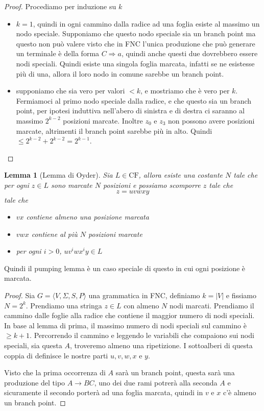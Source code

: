 \documentclass[12pt]{report}
\newtheorem{lemma}{Lemma}
\begin{document}
% 
\begin{proof}
 	Procediamo per induzione su $k$
 	\begin{itemize}
 		\item $k = 1$, quindi in ogni cammino dalla radice ad una foglia esiste al massimo un nodo speciale.
 			Supponiamo che questo nodo speciale sia un branch point
 			ma questo non può valere visto che in FNC l'unica produzione che può generare un terminale è della forma $C \Rightarrow a$, quindi anche questi due dovrebbero essere nodi speciali.
 			Quindi esiste una singola foglia marcata, infatti se ne esistesse più di una, allora il loro nodo in comune sarebbe un branch point.
 		\item supponiamo che sia vero per valori $< k$, e mostriamo che è vero per $k$.
 			Fermiamoci al primo nodo speciale dalla radice, e che questo sia un branch point, per ipotesi induttiva nell'abero di sinistra e di destra ci saranno al massimo $2^{k - 2}$ posizioni marcate.
 			Inoltre $z_0$ e $z_3$ non possono avere posizioni marcate, altrimenti il branch point sarebbe più in alto.
 			Quindi $\leq 2^{k - 2} + 2^{k - 2} = 2^{k - 1}$.
	\end{itemize}
\end{proof}

\begin{lemma}[Lemma di Oyder]
	Sia $L \in \text{CF}$, allora esiste una costante $N$ tale che per ogni $z \in L$ sono marcate $N$ posizioni e possiamo scomporre $z$ tale che
	$$ z = u v w x y $$
	tale che
	\begin{itemize}
		\item $vx$ contiene almeno una posizione marcata
		\item $vwx$ contiene al più $N$ posizioni marcate
		\item per ogni $i > 0$, $u v^i w x^i y \in L$
	\end{itemize}
\end{lemma}
Quindi il pumping lemma è un caso speciale di questo in cui ogni posizione è marcata.
\begin{proof}
	Sia $G = \langle V, \Sigma, S, P \rangle$ una grammatica in FNC, definiamo $k = |V|$ e fissiamo $N = 2^k$.
	Prendiamo una stringa $z \in L$ con almeno $N$ nodi marcati.
	Prendiamo il cammino dalle foglie alla radice che contiene il maggior numero di nodi speciali.
	In base al lemma di prima, il massimo numero di nodi speciali sul cammino è $\geq k + 1$.
	Percorrendo il cammino e leggendo le variabili che compaiono sui nodi speciali, sia questa $A$, troveremo almeno una ripetizione.
	I sottoalberi di questa coppia di definisce le nostre parti $u, v, w, x$ e $y$.

	Visto che la prima occorrenza di $A$ sarà un branch point, questa sarà una produzione del tipo $A \rightarrow BC$, uno dei due rami potrerà alla seconda $A$ e sicuramente il secondo porterà ad una foglia marcata, quindi in $v$ e $x$ c'è almeno un branch point.
\end{proof}
\end{document}
